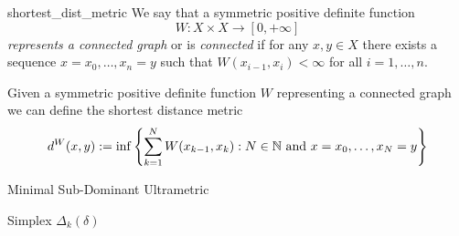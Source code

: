 \begin{definition}{}{shortest_dist_metric}
We say that a symmetric positive definite function
$$
W: X \times X \to [0, +\infty]
$$
\emph{represents a connected graph} or is \emph{connected} if for any $x,y \in X$ there exists a sequence $x = x_0, \dots, x_n = y$ such that $W(x_{i-1}, x_{i}) < \infty$ for all $i = 1, \dots, n$.
\end{definition}

\begin{definition}{}{}
Given a symmetric positive definite function $W$ representing a connected graph we can define the shortest distance metric
\begin{equation*}
    d^W(x,y) := \inf\left\{ \sum_{k = 1}^N W(x_{k-1}, x_k): N \in \mathbb N \text{ and } x = x_0, \dots, x_N = y\right\}
\end{equation*}
\end{definition}



\begin{defprop}{}{}

Minimal Sub-Dominant Ultrametric
\end{defprop}


\begin{definition}{Simplex $\Delta_k(\delta)$}{}
\end{definition}